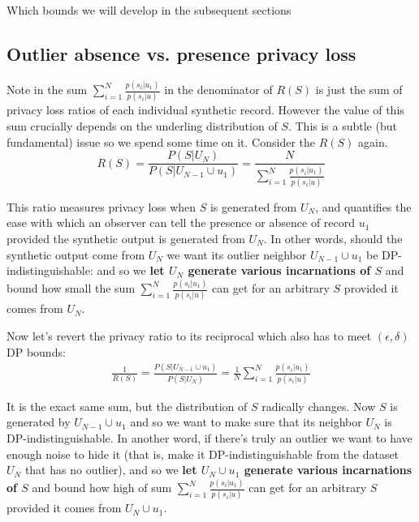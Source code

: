 \documentclass[11pt]{article}
\begin{document}
Which bounds we will develop in the subsequent sections

\subsection{Outlier absence vs. presence privacy loss}

Note in the sum $\sum_{i=1}^N  \frac{ p(s_i | u_1) } { p(s_i | u) }$ in the denominator of $R(S)$ is just the sum of privacy loss ratios of each individual synthetic record.  However the value of this sum crucially depends on the underling distribution of $S$.  This is a subtle (but fundamental) issue so we spend some time on it.  Consider the $R(S)$ again.
\begin{equation} \label{eq:outlierPLR} 
R(S) =  \frac{ P(S|U_N)} {P(S|U_{N-1} \cup u_1)} = \frac{N}{\sum_{i=1}^N  \frac{ p(s_i | u_1) } { p(s_i | u) }}
\end{equation}

This ratio measures privacy loss when $S$ is generated from $U_N$, and quantifies the ease with which an observer can tell the presence or absence of record $u_1$ provided the synthetic output is generated from $U_N$.  In other words, should the synthetic output come from $U_N$ we want its outlier neighbor $U_{N-1} \cup u_1$ be DP-indistinguishable: and so we \textbf{let $U_N$ generate various incarnations of $S$} and bound how small the sum $\sum_{i=1}^N  \frac{ p(s_i | u_1) } { p(s_i | u) }$ can get for an arbitrary $S$ provided it comes from $U_N$. 

Now let's revert the privacy ratio to its reciprocal which also has to meet $(\epsilon, \delta)$ DP bounds:
\begin{align}
\frac{1}{R(S)} =   \frac {P(S|U_{N-1} \cup u_1)} { P(S|U_N)} = \frac{1}{N} \sum_{i=1}^N  \frac{ p(s_i | u_1) } { p(s_i | u) }
\end{align}

It is the exact same sum, but the distribution of $S$ radically changes.  Now $S$ is generated by $U_{N-1} \cup u_1$ and so we want to make sure that its neighbor $U_N$ is  DP-indistinguishable.  In another word, if there's truly an outlier we want to have enough noise to hide it (that is, make it DP-indistinguishable from the dataset  $U_N$ that has no outlier), and so we \textbf{let $U_N \cup u_1$ generate various incarnations of $S$} and bound how high of sum $\sum_{i=1}^N  \frac{ p(s_i | u_1) } { p(s_i | u) }$ can get for an arbitrary $S$ provided it comes from $U_N \cup u_1$.
\end{document}
